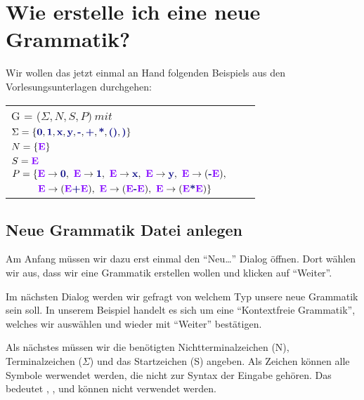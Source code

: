 \chapter{Wie erstelle ich eine neue Grammatik?}

Wir wollen das jetzt einmal an Hand folgenden Beispiels aus den
Vorlesungsunterlagen durchgehen:\vspace{10pt}


\begin{tabular}{lcr}
G = ($\Sigma, N, S, P )\ mit $\\
	$\Sigma = \{\TerminalSymbol{0}, \TerminalSymbol{1}, \TerminalSymbol{x},
	\TerminalSymbol{y}, \TerminalSymbol{-}, \TerminalSymbol{+},
	\TerminalSymbol{*}, \TerminalSymbol{()}, \TerminalSymbol{)}\}$\\ $N =
	\{\StartSymbol{E}\}$\\ $S=\StartSymbol{E}$\\ 
	$P = \{\StartSymbol{E} \to \TerminalSymbol{0},\ \StartSymbol{E} \to \TerminalSymbol{1},\ 
	\StartSymbol{E}	\to \TerminalSymbol{x},\ \StartSymbol{E} \to \TerminalSymbol{y},\ 
	\StartSymbol{E} \to (\TerminalSymbol{-}\StartSymbol{E}),$\\ 
	$\ \ \ \ \ \ \ \ \StartSymbol{E} \to (\StartSymbol{E} \TerminalSymbol{+}
	\StartSymbol{E}),\ \StartSymbol{E} \to (\StartSymbol{E} \TerminalSymbol{-} \StartSymbol{E}),\
	\StartSymbol{E} \to (\StartSymbol{E} \TerminalSymbol{*} \StartSymbol{E})\}$\\
\end{tabular}

\section{Neue Grammatik Datei anlegen}
 
Am Anfang müssen wir dazu erst einmal den "`Neu\ldots"' Dialog öffnen. Dort
wählen wir aus, dass wir eine Grammatik erstellen wollen und klicken auf
"`Weiter"'.\vspace{10pt}

Im nächsten Dialog werden wir gefragt von welchem Typ unsere neue Grammatik
sein soll. In unserem Beispiel handelt es sich um eine "`Kontextfreie
Grammatik"', welches wir auswählen und wieder mit "`Weiter"' bestätigen.\vspace{10pt}

Als nächstes müssen wir die benötigten Nichtterminalzeichen (N),
Terminalzeichen ($\Sigma$) und das Startzeichen (S) angeben.  Als Zeichen
können alle Symbole werwendet werden, die nicht zur Syntax der Eingabe gehören.
Das bedeutet \Symbol{,}, \Symbol{\{}, \Symbol{\}} und \Symbol{"}
können nicht verwendet werden.\vspace{10pt}

